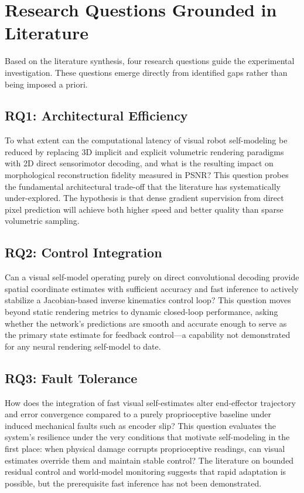 \documentclass[12pt,a4paper,oneside]{report}
\begin{document}
\section{Research Questions Grounded in Literature}

Based on the literature synthesis, four research questions guide the experimental investigation. These questions emerge directly from identified gaps rather than being imposed a priori.

\subsection{RQ1: Architectural Efficiency}
\label{subsec:rq1_architectural_efficiency}

To what extent can the computational latency of visual robot self-modeling be reduced by replacing 3D implicit and explicit volumetric rendering paradigms with 2D direct sensorimotor decoding, and what is the resulting impact on morphological reconstruction fidelity measured in PSNR? This question probes the fundamental architectural trade-off that the literature has systematically under-explored. The hypothesis is that dense gradient supervision from direct pixel prediction will achieve both higher speed and better quality than sparse volumetric sampling.

\subsection{RQ2: Control Integration}
\label{subsec:rq2_control_integration}

Can a visual self-model operating purely on direct convolutional decoding provide spatial coordinate estimates with sufficient accuracy and fast inference to actively stabilize a Jacobian-based inverse kinematics control loop? This question moves beyond static rendering metrics to dynamic closed-loop performance, asking whether the network's predictions are smooth and accurate enough to serve as the primary state estimate for feedback control—a capability not demonstrated for any neural rendering self-model to date.

\subsection{RQ3: Fault Tolerance}
\label{subsec:rq3_fault_tolerance}

How does the integration of fast visual self-estimates alter end-effector trajectory and error convergence compared to a purely proprioceptive baseline under induced mechanical faults such as encoder slip? This question evaluates the system's resilience under the very conditions that motivate self-modeling in the first place: when physical damage corrupts proprioceptive readings, can visual estimates override them and maintain stable control? The literature on bounded residual control and world-model monitoring suggests that rapid adaptation is possible, but the prerequisite fast inference has not been demonstrated.
\end{document}
